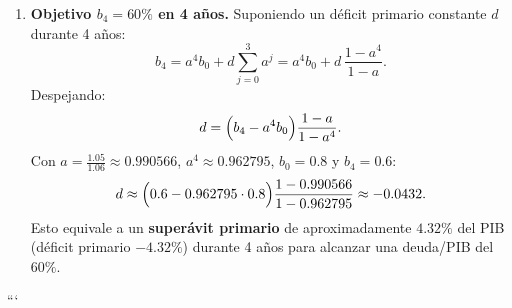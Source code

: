 \begin{solution}
\begin{enumerate}[label=\Alph*)]
\item \textbf{Objetivo $b_4=60\%$ en 4 años.}
Suponiendo un déficit primario constante $d$ durante 4 años:
\[
b_4=a^4 b_0 + d\sum_{j=0}^{3} a^j
= a^4 b_0 + d\,\frac{1-a^4}{1-a}.
\]
Despejando:
\[
d=\Bigl(b_4-a^4 b_0\Bigr)\frac{1-a}{1-a^4}.
\]
Con $a=\frac{1.05}{1.06}\approx 0.990566$, $a^4\approx 0.962795$, $b_0=0.8$ y $b_4=0.6$:
\[
d \approx \Bigl(0.6-0.962795\cdot 0.8\Bigr)\frac{1-0.990566}{1-0.962795}
\approx -0.0432.
\]
Esto equivale a un \textbf{superávit primario} de aproximadamente $4.32\%$ del PIB (déficit primario $-4.32\%$) durante 4 años para alcanzar una deuda/PIB del $60\%$.
\end{enumerate}
\end{solution}
```
